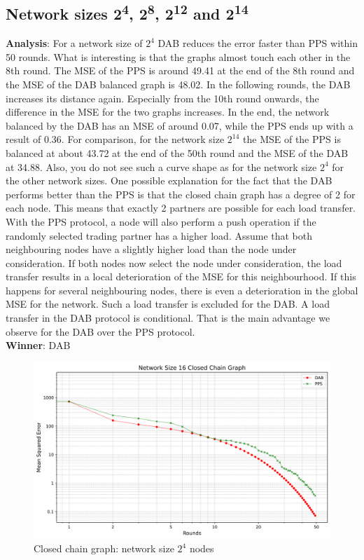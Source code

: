 \subsection{Network sizes 2\textsuperscript{4}, 2\textsuperscript{8}, 2\textsuperscript{12} and 2\textsuperscript{14}}
\textbf{Analysis}: For a network size of $2^{4}$ DAB reduces the error faster than PPS within 50 rounds. What is interesting is that the graphs almost touch each other in the 8th round. The MSE of the PPS is around 49.41 at the end of the 8th round and the MSE of the DAB balanced graph is 48.02. In the following rounds, the DAB increases its distance again. Especially from the 10th round onwards, the difference in the MSE for the two graphs increases. In the end, the network balanced by the DAB has an MSE of around 0.07, while the PPS ends up with a result of 0.36. For comparison, for the network size $2^{14}$ the MSE of the PPS is balanced at about 43.72 at the end of the 50th round and the MSE of the DAB at 34.88. Also, you do not see such a curve shape as for the network size $2^{4}$ for the other network sizes. One possible explanation for the fact that the DAB performs better than the PPS is that the closed chain graph has a degree of 2 for each node. This means that exactly 2 partners are possible for each load transfer. With the PPS protocol, a node will also perform a push operation if the randomly selected trading partner has a higher load. Assume that both neighbouring nodes have a slightly higher load than the node under consideration. If both nodes now select the node under consideration, the load transfer results in a local deterioration of the MSE for this neighbourhood. If this happens for several neighbouring nodes, there is even a deterioration in the global MSE for the network. Such a load transfer is excluded for the DAB. A load transfer in the DAB protocol is conditional. That is the main advantage we observe for the DAB over the PPS protocol. \\
\textbf{Winner}: DAB\\
\begin{figure}[H]
    \centering
    \includegraphics[scale=0.5]{figures/closedChainSimulations/DAB_vs_PPS_CCG_r50_n16.png}
    \caption{Closed chain graph: network size $2^{4}$ nodes}
    \label{fig:16ChainGraph}
\end{figure}

